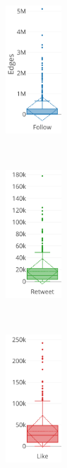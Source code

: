 \begin{figure}[h!tb]
    \centering
    \begin{subfigure}
        \centering
        \includegraphics[width=0.23\textwidth]{fig/net_struct/number_edges_follow.png}
    \end{subfigure}%
    ~ 
    \begin{subfigure}
        \centering
        \includegraphics[width=0.23\textwidth]{fig/net_struct/number_edges_retweets.png}
    \end{subfigure}
    ~
    \begin{subfigure}
        \centering
        \includegraphics[width=0.23\textwidth]{fig/net_struct/number_edges_likes.png}

\end{subfigure}
\end{figure}
